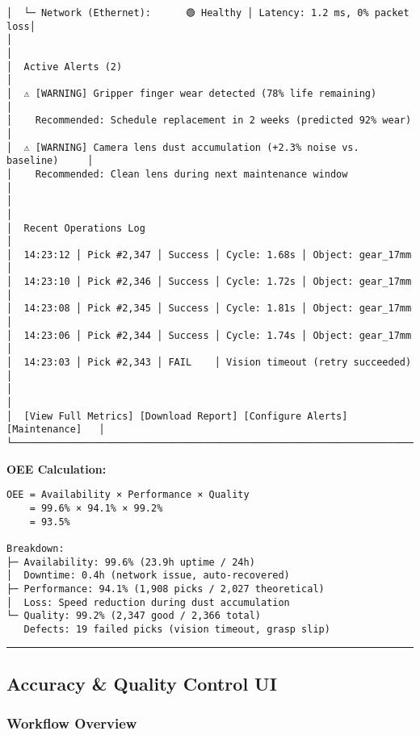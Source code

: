 \documentclass[
]{article}
\begin{document}
\begin{verbatim}
│  └─ Network (Ethernet):      🟢 Healthy │ Latency: 1.2 ms, 0% packet loss│
│                                                                            │
│  Active Alerts (2)                                                         │
│  ⚠ [WARNING] Gripper finger wear detected (78% life remaining)            │
│    Recommended: Schedule replacement in 2 weeks (predicted 92% wear)      │
│  ⚠ [WARNING] Camera lens dust accumulation (+2.3% noise vs. baseline)     │
│    Recommended: Clean lens during next maintenance window                 │
│                                                                            │
│  Recent Operations Log                                                     │
│  14:23:12 │ Pick #2,347 │ Success │ Cycle: 1.68s │ Object: gear_17mm     │
│  14:23:10 │ Pick #2,346 │ Success │ Cycle: 1.72s │ Object: gear_17mm     │
│  14:23:08 │ Pick #2,345 │ Success │ Cycle: 1.81s │ Object: gear_17mm     │
│  14:23:06 │ Pick #2,344 │ Success │ Cycle: 1.74s │ Object: gear_17mm     │
│  14:23:03 │ Pick #2,343 │ FAIL    │ Vision timeout (retry succeeded)    │
│                                                                            │
│  [View Full Metrics] [Download Report] [Configure Alerts] [Maintenance]   │
└────────────────────────────────────────────────────────────────────────────┘
\end{verbatim}

\textbf{OEE Calculation:}

\begin{verbatim}
OEE = Availability × Performance × Quality
    = 99.6% × 94.1% × 99.2%
    = 93.5%

Breakdown:
├─ Availability: 99.6% (23.9h uptime / 24h)
│  Downtime: 0.4h (network issue, auto-recovered)
├─ Performance: 94.1% (1,908 picks / 2,027 theoretical)
│  Loss: Speed reduction during dust accumulation
└─ Quality: 99.2% (2,347 good / 2,366 total)
   Defects: 19 failed picks (vision timeout, grasp slip)
\end{verbatim}

\begin{center}\rule{0.5\linewidth}{0.5pt}\end{center}

\hypertarget{accuracy-quality-control-ui}{%
\subsection{Accuracy \& Quality Control
UI}\label{accuracy-quality-control-ui}}

\hypertarget{workflow-overview-7}{%
\subsubsection{Workflow Overview}\label{workflow-overview-7}}
\end{document}
